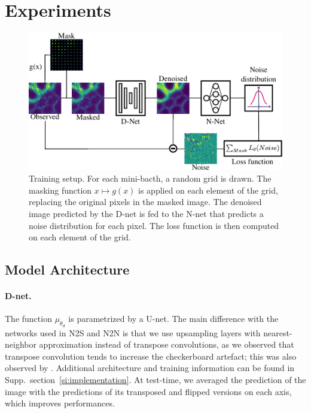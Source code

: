 \documentclass{article}
\begin{document}
\section{Experiments}
\begin{figure}[ht]
\begin{center}
\centerline{\includegraphics[width=\columnwidth]{fig_plomberie.pdf}}
\caption{Training setup.
For each mini-bacth, a random grid is drawn.
The masking function $x\mapsto g(x)$ is applied on each element of the grid, replacing the original pixels in the masked image.
The denoised image predicted by the D-net is fed to the N-net that predicts a noise distribution for each pixel.
The loss function is then computed on each element of the grid.
}
\label{fig:plumbing}
\end{center}
\vskip -0.2in
\end{figure}

\label{sec:experiments}
\subsection{Model Architecture}
\paragraph{D-net.}
The function $\mu_{\theta_d}$ is parametrized by a U-net. The main difference with the networks used in N2S and N2N is that we use upsampling layers with nearest-neighbor approximation instead of transpose convolutions, as we observed that transpose convolution tends to increase the checkerboard artefact; this was also observed by \cite{kobayashi2020image}. Additional architecture and training information can be found in Supp.~section~\ref{si:implementation}.
At test-time, we averaged the prediction of the image with the predictions of its transposed and flipped versions on each axis, which improves performances.
\end{document}
